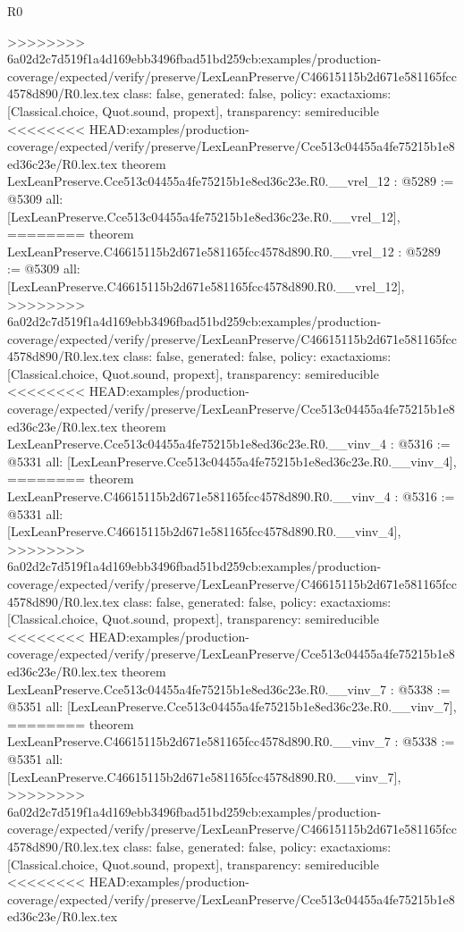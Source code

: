 \begin{lexlean}{R0}
\begin{coremodule}
{{{{{{{{{{{{{{{{{{{{{{{{{{{{{{{{{{{{{{{{{{{{{{{{{{{{{{{{{{{{{{{{{{{{{{{{{>>>>>>>> 6a02d2c7d519f1a4d169ebb3496fbad51bd259cb:examples/production-coverage/expected/verify/preserve/LexLeanPreserve/C46615115b2d671e581165fcc4578d890/R0.lex.tex
  class: false,
  generated: false,
  policy: exact{axioms: [Classical.choice, Quot.sound, propext]},
  transparency: semireducible
}
<<<<<<<< HEAD:examples/production-coverage/expected/verify/preserve/LexLeanPreserve/Cce513c04455a4fe75215b1e8ed36c23e/R0.lex.tex
theorem LexLeanPreserve.Cce513c04455a4fe75215b1e8ed36c23e.R0.__vrel_12 : @5289 := @5309 {
  all: [LexLeanPreserve.Cce513c04455a4fe75215b1e8ed36c23e.R0.__vrel_12],
========
theorem LexLeanPreserve.C46615115b2d671e581165fcc4578d890.R0.__vrel_12 : @5289 := @5309 {
  all: [LexLeanPreserve.C46615115b2d671e581165fcc4578d890.R0.__vrel_12],
>>>>>>>> 6a02d2c7d519f1a4d169ebb3496fbad51bd259cb:examples/production-coverage/expected/verify/preserve/LexLeanPreserve/C46615115b2d671e581165fcc4578d890/R0.lex.tex
  class: false,
  generated: false,
  policy: exact{axioms: [Classical.choice, Quot.sound, propext]},
  transparency: semireducible
}
<<<<<<<< HEAD:examples/production-coverage/expected/verify/preserve/LexLeanPreserve/Cce513c04455a4fe75215b1e8ed36c23e/R0.lex.tex
theorem LexLeanPreserve.Cce513c04455a4fe75215b1e8ed36c23e.R0.__vinv_4 : @5316 := @5331 {
  all: [LexLeanPreserve.Cce513c04455a4fe75215b1e8ed36c23e.R0.__vinv_4],
========
theorem LexLeanPreserve.C46615115b2d671e581165fcc4578d890.R0.__vinv_4 : @5316 := @5331 {
  all: [LexLeanPreserve.C46615115b2d671e581165fcc4578d890.R0.__vinv_4],
>>>>>>>> 6a02d2c7d519f1a4d169ebb3496fbad51bd259cb:examples/production-coverage/expected/verify/preserve/LexLeanPreserve/C46615115b2d671e581165fcc4578d890/R0.lex.tex
  class: false,
  generated: false,
  policy: exact{axioms: [Classical.choice, Quot.sound, propext]},
  transparency: semireducible
}
<<<<<<<< HEAD:examples/production-coverage/expected/verify/preserve/LexLeanPreserve/Cce513c04455a4fe75215b1e8ed36c23e/R0.lex.tex
theorem LexLeanPreserve.Cce513c04455a4fe75215b1e8ed36c23e.R0.__vinv_7 : @5338 := @5351 {
  all: [LexLeanPreserve.Cce513c04455a4fe75215b1e8ed36c23e.R0.__vinv_7],
========
theorem LexLeanPreserve.C46615115b2d671e581165fcc4578d890.R0.__vinv_7 : @5338 := @5351 {
  all: [LexLeanPreserve.C46615115b2d671e581165fcc4578d890.R0.__vinv_7],
>>>>>>>> 6a02d2c7d519f1a4d169ebb3496fbad51bd259cb:examples/production-coverage/expected/verify/preserve/LexLeanPreserve/C46615115b2d671e581165fcc4578d890/R0.lex.tex
  class: false,
  generated: false,
  policy: exact{axioms: [Classical.choice, Quot.sound, propext]},
  transparency: semireducible
}
<<<<<<<< HEAD:examples/production-coverage/expected/verify/preserve/LexLeanPreserve/Cce513c04455a4fe75215b1e8ed36c23e/R0.lex.tex
}}}}}}}}}}}}}}}}}}}}}}}}}}}}}}}}}}}}}}}}}}}}}}}}}}}}}}}}}}}}}}}}}}}}}}}}}}}
\end{coremodule}
\end{lexlean}
